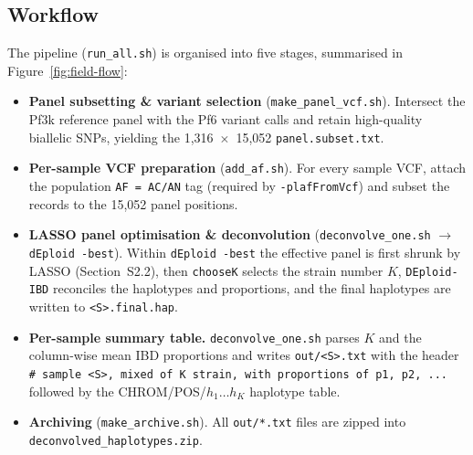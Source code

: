 \documentclass{article}
\begin{document}
\subsection{Workflow}
\label{sec:field-workflow}

The pipeline (\texttt{run\_all.sh}) is organised into five stages, summarised
in Figure~\ref{fig:field-flow}:

\begin{itemize}
  \item[\textbf{Stage 1}] \textbf{Panel subsetting \& variant selection}
    (\texttt{make\_panel\_vcf.sh}). Intersect the Pf3k reference panel with
    the Pf6 variant calls and retain high-quality biallelic SNPs, yielding the
    1,316~$\times$~15,052 \texttt{panel.subset.txt}.
  \item[\textbf{Stage 2}] \textbf{Per-sample VCF preparation}
    (\texttt{add\_af.sh}). For every sample VCF, attach the population
    \texttt{AF = AC/AN} tag (required by \texttt{-plafFromVcf}) and subset the
    records to the 15,052 panel positions.
  \item[\textbf{Stage 3}] \textbf{LASSO panel optimisation \& deconvolution}
    (\texttt{deconvolve\_one.sh} $\rightarrow$ \texttt{dEploid -best}). Within
    \texttt{dEploid -best} the effective panel is first shrunk by LASSO
    (Section~S2.2), then \texttt{chooseK} selects the strain number $K$,
    \texttt{DEploid-IBD} reconciles the haplotypes and proportions, and the
    final haplotypes are written to \texttt{<S>.final.hap}.
  \item[\textbf{Stage 4}] \textbf{Per-sample summary table.}
    \texttt{deconvolve\_one.sh} parses $K$ and the column-wise mean IBD
    proportions and writes \texttt{out/<S>.txt} with the header
    \texttt{\# sample <S>, mixed of K strain, with proportions of p1, p2, ...}
    followed by the CHROM/POS/$h_1\!\ldots h_K$ haplotype table.
  \item[\textbf{Stage 5}] \textbf{Archiving} (\texttt{make\_archive.sh}). All
    \texttt{out/*.txt} files are zipped into
    \texttt{deconvolved\_haplotypes.zip}.
\end{itemize}
\end{document}
